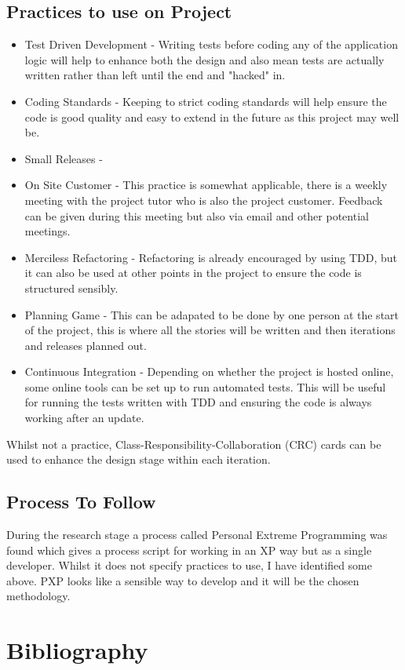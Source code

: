 \documentclass{article}
\begin{document}
\subsection{Practices to use on Project}
\begin{itemize}
	\item Test Driven Development - Writing tests before coding any of the application logic will help to enhance both the design and also mean tests are actually written rather than left until the end and "hacked" in.
	\item Coding Standards - Keeping to strict coding standards will help ensure the code is good quality and easy to extend in the future as this project may well be.
	\item Small Releases - 
	\item On Site Customer - This practice is somewhat applicable, there is a weekly meeting with the project tutor who is also the project customer. Feedback can be given during this meeting but also via email and other potential meetings.
	\item Merciless Refactoring - Refactoring is already encouraged by using TDD, but it can also be used at other points in the project to ensure the code is structured sensibly.
	\item Planning Game - This can be adapated to be done by one person at the start of the project, this is where all the stories will be written and then iterations and releases planned out.
	\item Continuous Integration - Depending on whether the project is hosted online, some online tools can be set up to run automated tests. This will be useful for running the tests written with TDD and ensuring the code is always working after an update.
\end{itemize}
Whilst not a practice, Class-Responsibility-Collaboration (CRC) cards can be used to enhance the design stage within each iteration.

\subsection{Process To Follow}
During the research stage a process called Personal Extreme Programming was found\cite{agarwal2008extreme} which gives a process script for working in an XP way but as a single developer. Whilst it does not specify practices to use, I have identified some above. PXP looks like a sensible way to develop and it will be the chosen methodology.
\newpage

\section{Bibliography}


%
\end{document}
